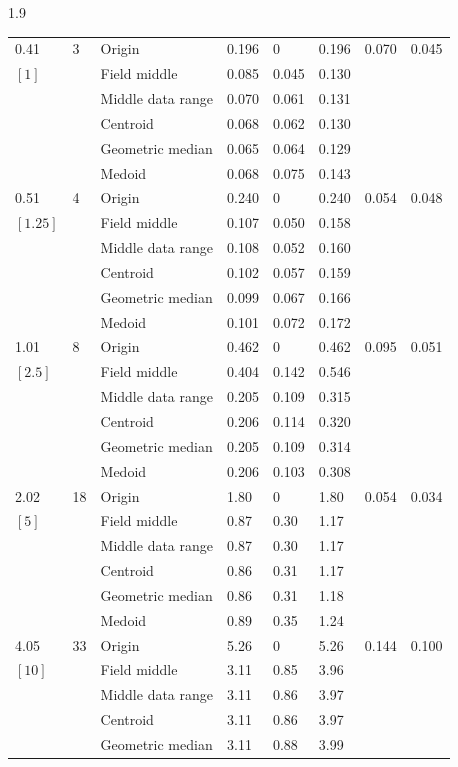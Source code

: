 \documentclass[phd]{ndsu-thesis-2022}
\newcommand\myspacing{1.9} %
\begin{document}
\begin{spacing}{\myspacing}
{{\begin{ThreePartTable}
\begin{longtable}{lll lll ll}
0.41 & 3 & Origin  & 0.196 & 0 & 0.196 & 0.070 & 0.045 \\
$[1]$ &  & Field middle  & 0.085 & 0.045 & 0.130 \\
 &  & Middle data range  & 0.070 & 0.061 & 0.131 \\
 &  & Centroid & 0.068 & 0.062 & 0.130 \\
 &  & Geometric median & 0.065 & 0.064 & 0.129 \\
 &  & Medoid  & 0.068 & 0.075 & 0.143 \\
\midrule
0.51 & 4 & Origin  & 0.240 & 0 & 0.240 & 0.054 & 0.048 \\
$[1.25]$ &  & Field middle  & 0.107 & 0.050 & 0.158 \\
 &  & Middle data range  & 0.108 & 0.052 & 0.160 \\
 &  & Centroid & 0.102 & 0.057 & 0.159 \\
 &  & Geometric median & 0.099 & 0.067 & 0.166 \\
 &  & Medoid  & 0.101 & 0.072 & 0.172 \\
\midrule
1.01 & 8 & Origin  & 0.462 & 0 & 0.462 & 0.095 & 0.051 \\
$[2.5]$ &  & Field middle  & 0.404 & 0.142 & 0.546 \\
 &  & Middle data range  & 0.205 & 0.109 & 0.315 \\
 &  & Centroid & 0.206 & 0.114 & 0.320 \\
 &  & Geometric median & 0.205 & 0.109 & 0.314 \\
 &  & Medoid  & 0.206 & 0.103 & 0.308 \\
\midrule
2.02 & 18 & Origin  & 1.80 & 0 & 1.80 & 0.054 & 0.034 \\
$[5]$ &  & Field middle  & 0.87 & 0.30 & 1.17 \\
 &  & Middle data range  & 0.87 & 0.30 & 1.17 \\
 &  & Centroid & 0.86 & 0.31 & 1.17 \\
 &  & Geometric median & 0.86 & 0.31 & 1.18 \\
 &  & Medoid  & 0.89 & 0.35 & 1.24 \\
\midrule
4.05 & 33 & Origin  & 5.26 & 0 & 5.26 & 0.144 & 0.100 \\
$[10]$ &  & Field middle  & 3.11 & 0.85 & 3.96 \\
 &  & Middle data range  & 3.11 & 0.86 & 3.97 \\
 &  & Centroid & 3.11 & 0.86 & 3.97 \\
 &  & Geometric median & 3.11 & 0.88 & 3.99 \\

\end{longtable}
\end{ThreePartTable}}}
\end{spacing}
\end{document}
